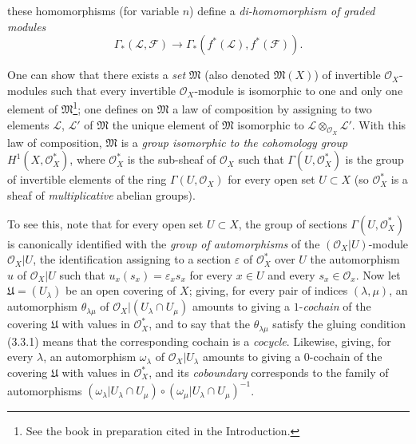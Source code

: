 \begin{env}[5.4.6]

these homomorphisms (for variable $n$) define a
\emph{di-homomorphism of graded modules}
\[
  \Gamma_*(\mathcal{L},\mathcal{F})
  \longrightarrow
  \Gamma_*(f^*(\mathcal{L}),f^*(\mathcal{F})).
\]
\end{env}

\begin{env}[5.4.7]\label{0.5.4.7}
One can show that there exists a \emph{set} $\mathfrak{M}$ (also denoted
$\mathfrak{M}(X)$) of invertible $\mathcal{O}_X$-modules such that every
invertible $\mathcal{O}_X$-module is isomorphic to one and only one element of
$\mathfrak{M}$\footnote{See the book in preparation cited in
the Introduction.}; one defines on $\mathfrak{M}$ a law of composition by
assigning to two elements $\mathcal{L}$, $\mathcal{L}'$ of
$\mathfrak{M}$ the unique element of $\mathfrak{M}$ isomorphic to
$\mathcal{L}\otimes_{\mathcal{O}_X}\mathcal{L}'$. With this law of
composition, $\mathfrak{M}$ is a \emph{group isomorphic to the cohomology
group} $H^1(X,\mathcal{O}_X^*)$, where $\mathcal{O}_X^*$ is the
sub-sheaf of $\mathcal{O}_X$ such that $\Gamma(U,\mathcal{O}_X^*)$ is the
group of invertible elements of the ring $\Gamma(U,\mathcal{O}_X)$ for
every open set $U\subset X$ (so $\mathcal{O}_X^*$ is a sheaf of
\emph{multiplicative} abelian groups).

To see this, note that for every open set $U\subset X$, the group of sections
$\Gamma(U,\mathcal{O}_X^*)$ is canonically identified with the \emph{group of
automorphisms} of the $(\mathcal{O}_X|U)$-module $\mathcal{O}_X|U$,
the identification assigning to a section $\varepsilon$ of
$\mathcal{O}_X^*$ over $U$ the automorphism $u$ of $\mathcal{O}_X|U$
such that $u_x(s_x)=\varepsilon_xs_x$ for every $x\in U$ and every
$s_x\in\mathcal{O}_x$. Now let $\mathfrak{U}=(U_\lambda)$ be an open
covering of $X$; giving, for every pair of indices $(\lambda,\mu)$, an
automorphism $\theta_{\lambda\mu}$ of
$\mathcal{O}_X|(U_\lambda\cap U_\mu)$ amounts to giving a
$1$-\emph{cochain} of the covering $\mathfrak{U}$ with values in
$\mathcal{O}_X^*$, and to say that the $\theta_{\lambda\mu}$ satisfy the
gluing condition (3.3.1) means that the corresponding cochain is
a \emph{cocycle}. Likewise, giving, for every $\lambda$, an automorphism
$\omega_\lambda$ of $\mathcal{O}_X|U_\lambda$ amounts to giving a
$0$-cochain of the covering $\mathfrak{U}$ with values in
$\mathcal{O}_X^*$, and its \emph{coboundary} corresponds to the family of
automorphisms
$(\omega_\lambda|U_\lambda\cap U_\mu)\circ
 (\omega_\mu|U_\lambda\cap U_\mu)^{-1}$.


\end{env}

